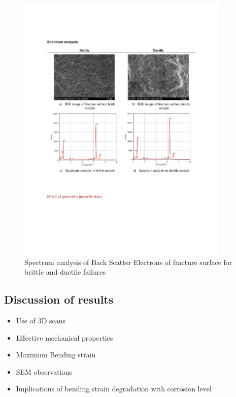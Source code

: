 \begin{figure}[htbp]
	\centering
	\includegraphics[width=0.9\textwidth]{VAC Thesis 2.0/Chapter-4/figs/BBT_SpectrumAnalysis.pdf}
	\caption{Spectrum analysis of Back Scatter Electrons of fracture surface for brittle and ductile failures}
	\label{fig:SpectrumAnalysis}
\end{figure}

\subsection{Discussion of results}

\begin{itemize}
    \item Use of 3D scans
    \item Effective mechanical properties
    \item Maximum Bending strain
    \item SEM observations
    \item Implications of bending strain degradation with corrosion level
\end{itemize}